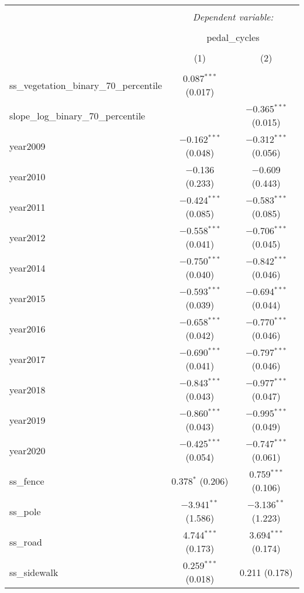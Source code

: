 
\begin{table}[!htbp] \centering 
  \caption{} 
  \label{} 
\small 
\begin{tabular}{@{\extracolsep{1pt}}lcc} 
\\[-1.8ex]\hline 
\hline \\[-1.8ex] 
 & \multicolumn{2}{c}{\textit{Dependent variable:}} \\ 
\cline{2-3} 
\\[-1.8ex] & \multicolumn{2}{c}{pedal\_cycles} \\ 
\\[-1.8ex] & (1) & (2)\\ 
\hline \\[-1.8ex] 
 ss\_vegetation\_binary\_70\_percentile & 0.087$^{***}$ (0.017) &  \\ 
  slope\_log\_binary\_70\_percentile &  & $-$0.365$^{***}$ (0.015) \\ 
  year2009 & $-$0.162$^{***}$ (0.048) & $-$0.312$^{***}$ (0.056) \\ 
  year2010 & $-$0.136 (0.233) & $-$0.609 (0.443) \\ 
  year2011 & $-$0.424$^{***}$ (0.085) & $-$0.583$^{***}$ (0.085) \\ 
  year2012 & $-$0.558$^{***}$ (0.041) & $-$0.706$^{***}$ (0.045) \\ 
  year2014 & $-$0.750$^{***}$ (0.040) & $-$0.842$^{***}$ (0.046) \\ 
  year2015 & $-$0.593$^{***}$ (0.039) & $-$0.694$^{***}$ (0.044) \\ 
  year2016 & $-$0.658$^{***}$ (0.042) & $-$0.770$^{***}$ (0.046) \\ 
  year2017 & $-$0.690$^{***}$ (0.041) & $-$0.797$^{***}$ (0.046) \\ 
  year2018 & $-$0.843$^{***}$ (0.043) & $-$0.977$^{***}$ (0.047) \\ 
  year2019 & $-$0.860$^{***}$ (0.043) & $-$0.995$^{***}$ (0.049) \\ 
  year2020 & $-$0.425$^{***}$ (0.054) & $-$0.747$^{***}$ (0.061) \\ 
  ss\_fence & 0.378$^{*}$ (0.206) & 0.759$^{***}$ (0.106) \\ 
  ss\_pole & $-$3.941$^{**}$ (1.586) & $-$3.136$^{**}$ (1.223) \\ 
  ss\_road & 4.744$^{***}$ (0.173) & 3.694$^{***}$ (0.174) \\ 
  ss\_sidewalk & 0.259$^{***}$ (0.018) & 0.211 (0.178) \\ 

\end{tabular}
\end{table}
